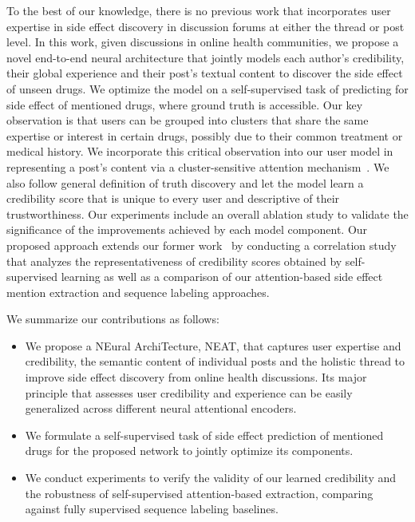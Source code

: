 \documentclass{bmcart}
\begin{document}
To the best of our knowledge, there is no previous work that incorporates user expertise in side effect discovery in discussion forums at either the thread or post level.
In this work, given discussions in online health communities, we propose a novel end-to-end neural architecture that jointly models each author's credibility, their global experience and their post's textual content to discover the side effect of unseen drugs.
We optimize the model on a self-supervised task of predicting for side effect of mentioned drugs, where ground truth is accessible.
Our key observation is that users can be grouped into clusters 
that share the same expertise or interest in certain drugs, 
possibly due to their common treatment or medical history. 
We incorporate this critical observation into our user model in representing a post's content via a cluster-sensitive attention mechanism~\cite{halder2018cold}.
We also follow general definition of truth discovery and let the
model learn a credibility score that is unique to every user and
descriptive of their trustworthiness.
Our experiments include an overall ablation study to validate the significance of the improvements achieved by each model component. Our proposed approach extends 
our former work~\cite{nguyen-etal-2018-treatment}  
by conducting a correlation study that analyzes the representativeness of 
credibility scores obtained by self-supervised learning  
as well as a comparison of our attention-based side effect mention extraction and sequence labeling approaches.

We summarize our contributions as follows: 
\begin{itemize}
\item We propose a NEural ArchiTecture, NEAT, that captures user expertise and credibility, the semantic content of individual posts and the holistic thread to improve side effect discovery from online health discussions. 
Its major principle that assesses user credibility and experience can be easily generalized across different neural attentional encoders.
\item We formulate a self-supervised task of side effect prediction of mentioned drugs for the proposed network to jointly optimize its components.
\item We conduct experiments to verify the validity of our learned credibility and the robustness of self-supervised attention-based extraction, comparing against fully supervised sequence labeling baselines.
\end{itemize}
\end{document}
